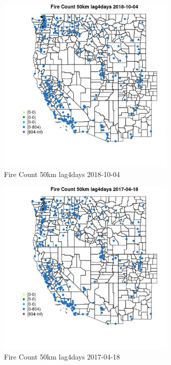 \begin{figure} 
\centering  
\includegraphics[width=0.77\textwidth]{Code_Outputs/Report_ML_input_PM25_Step4_part_f_de_duplicated_aveswNAs_MapObsFire_Count_50km_lag4days2018-10-04.jpg} 
\caption{\label{fig:Report_ML_input_PM25_Step4_part_f_de_duplicated_aveswNAsMapObsFire_Count_50km_lag4days2018-10-04}Fire Count 50km lag4days 2018-10-04} 
\end{figure} 
 

\begin{figure} 
\centering  
\includegraphics[width=0.77\textwidth]{Code_Outputs/Report_ML_input_PM25_Step4_part_f_de_duplicated_aveswNAs_MapObsFire_Count_50km_lag4days2017-04-18.jpg} 
\caption{\label{fig:Report_ML_input_PM25_Step4_part_f_de_duplicated_aveswNAsMapObsFire_Count_50km_lag4days2017-04-18}Fire Count 50km lag4days 2017-04-18} 
\end{figure} 
 

